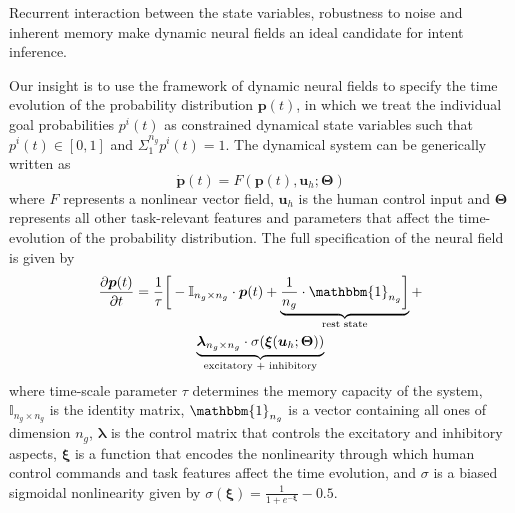 \documentclass[natbib, twocolumn]{svjour3}          %
\begin{document}
Recurrent interaction between the state variables, 
robustness to noise and inherent memory make dynamic neural fields an ideal candidate for intent inference. 

Our insight is to use the framework of dynamic neural fields to specify the time evolution of the probability distribution $\boldsymbol{p}(t)$, in which we treat the individual goal probabilities $p^i(t)$ as constrained dynamical state variables such that $p^i(t) \in [0, 1]$ and $\Sigma_{1}^{n_g}p^{i}(t) = 1$. The dynamical system can be generically written as 
\begin{equation*}
\dot{\boldsymbol{p}}(t) = F(\boldsymbol{p}(t), \boldsymbol{u}_h ; \boldsymbol{\Theta})
\end{equation*}
where $F$ represents a nonlinear vector field, $\boldsymbol{u}_h$ is the human control input and $\boldsymbol{\Theta}$ represents all other task-relevant features and parameters that affect the time-evolution of the probability distribution. 
The full specification of the neural field is given by
\begin{multline}\label{eq:dft}
\frac{\partial \boldsymbol{p}(t)}{\partial t} = \frac{1}{\tau}\bigg[-\mathbb{I}_{n_g\times n_g}\cdot\boldsymbol{p}(t) + \underbrace{\frac{1}{n_g}\cdot\mathbbm{1}_{n_g}\bigg]}_{\text{rest state}} + \\ \underbrace{\boldsymbol{\lambda}_{n_g\times n_g}\cdot\sigma(\boldsymbol{\xi}(\boldsymbol{u}_h;\boldsymbol{\Theta}))}_{\text{excitatory + inhibitory}}
\end{multline}
where time-scale parameter $\tau$ determines the memory capacity of the system, $\mathbb{I}_{n_g\times n_g}$ is the identity matrix, $\mathbbm{1}_{n_g}$ is a vector containing all ones of dimension $n_g$, $\boldsymbol{\lambda}$ is the control matrix that controls the excitatory and inhibitory aspects, $\boldsymbol{\xi}$ is a function that encodes the nonlinearity through which human control commands and task features affect the time evolution, and $\sigma$ is a biased sigmoidal nonlinearity given by $\sigma(\boldsymbol{\xi}) = \frac{1}{1 + e^{-\boldsymbol{\xi}}} - 0.5$.
\end{document}
